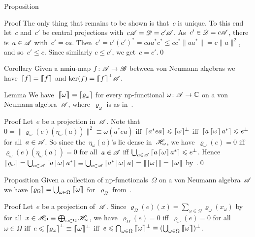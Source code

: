\documentclass[a]{subfiles}
\begin{document}
\begin{parsec}
\begin{point}{Proposition}
\begin{point}{Proof}
The only thing that remains to be shown is that~$c$
is unique.
To this end let~$c$ and~$c'$ be central projections 
with~$c\mathscr{A} = \mathscr{D}=c'\mathscr{A}$.
As~$c'\in\mathscr{D}=c \mathscr{A}$,
there is~$a\in \mathscr{A}$
with~$c' = ca$.
Then~$c' = c'(c')^* = caa^*c^*\leq 
cc^*\|aa^*\|=c\|a\|^2$,
and so~$c'\leq c$.
Since similarly $c\leq c'$, we get~$c=c'$.\qed
\end{point}
\end{point}
\begin{point}{Corollary}%
Given a nmiu-map $f\colon \mathscr{A}\to\mathscr{B}$
between von Neumann algebras
we have~$\left\lceil f\right\rceil=\left\lceil\!\!\left\lceil f\right\rceil\!\!\right\rceil$
and $\ker(f)=\left\lceil\!\!\left\lceil f\right\rceil\!\!\right\rceil^\perp\!\mathscr{A}$.
\end{point}
\begin{point}{Lemma}%
We have~$\left\lceil\!\!\left\lceil\omega\right\rceil\!\!\right\rceil=
\left\lceil\varrho_\omega\right\rceil$
for every np-functional $\omega\colon \mathscr{A}\to\mathbb{C}$
on a von Neumann algebra~$\mathscr{A}$,
where~$\varrho_\omega$
is as in~.
\begin{point}{Proof}%
Let~$e$ be a projection in~$\mathscr{A}$.
Note that $0=\|\varrho_\omega(e)(\eta_\omega(a))\|^2
\equiv \omega(a^*ea)$
iff~$\left\lceil a^*ea\right\rceil\leqslant \smash{\left\lceil\omega\right\rceil}^\perp$
iff~$\left\lceil a\left\lceil\omega\right\rceil a^*\right\rceil\leqslant e^\perp$
for all~$a\in\mathscr{A}$.
So since the~$\eta_\omega(a)$'s lie dense in~$\mathscr{H}_\omega$,
we have~$\varrho_\omega(e)=0$
iff $\varrho_\omega(e)(\eta_\omega(a))=0$ for all~$a\in\mathscr{A}$
iff $\bigcup_{a\in\mathscr{A}} \left\lceil a\left\lceil\omega\right\rceil a^*\right\rceil\leqslant e^\perp$.
Hence $\ceil{\varrho_\omega}=
\bigcup_{a\in\scrA}
\ceil{a\ceil{\omega}a^*} \equiv
\bigcup_{a\in\scrA}
\ceil{a^*\ceil{\omega}a}
=\cceil{\ceil{\omega}}
=\cceil{\omega}$
by~.\qed
\end{point}
\end{point}
\begin{point}{Proposition}%
Given a collection of np-functionals~$\Omega$
on a von Neumann algebra~$\mathscr{A}$
we have $\left\lceil\varrho_\Omega\right\rceil
=\bigcup_{\omega\in\Omega} \left\lceil\!\!\left\lceil\omega\right\rceil\!\!\right\rceil$
for~$\varrho_\Omega$
from~.
\begin{point}{Proof}%
Let~$e$ be a projection of~$\mathscr{A}$.
Since
$\varrho_\Omega(e)(x)
= \sum_{\omega\in\Omega} \varrho_\omega(x_\omega)$
by~
for all~$x\in\mathscr{H}_\Omega\equiv\bigoplus_{\omega\in\Omega}\mathscr{H}_\omega$,
we have~$\varrho_\Omega(e)=0$
iff~$\varrho_\omega(e)=0$ for all~$\omega\in\Omega$
iff~$e\leqslant \smash{\left\lceil\varrho_\omega\right\rceil^\perp \equiv 
\smash{\left\lceil\!\!\left\lceil\omega\right\rceil\!\!\right\rceil}^\perp}$
iff~$e\leq \bigcap_{\omega\in\Omega}\smash{\cceil{\omega}}^\perp 
\equiv (\bigcup_{\omega\in\Omega} \cceil{\omega})^\perp$.

\end{point}
\end{point}
\end{parsec}
\end{document}
